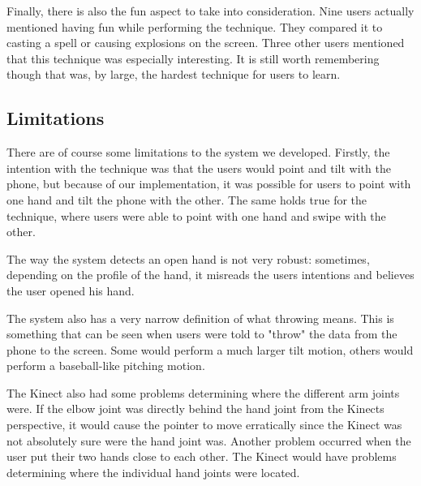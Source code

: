 Finally, there is also the fun aspect to take into consideration. Nine users actually mentioned having fun while performing the \pinch technique. 
They compared it to casting a spell or causing explosions on the screen. Three other users mentioned that this technique was especially interesting. 
It is still worth remembering though that \pinch was, by large, the hardest technique for users to learn. 

\subsection{Limitations}
\label{sec:limitations}
There are of course some limitations to the system we developed. 
Firstly, the intention with the \tilt technique was that the users would point and tilt with the phone, but because of our implementation, it was possible for users to point with one hand and tilt the phone with the other.
The same holds true for the \swipe technique, where users were able to point with one hand and swipe with the other.

The way the system detects an open hand is not very robust: sometimes, depending on the profile of the hand, it misreads the users intentions and believes the user opened his hand. 

The system also has a very narrow definition of what throwing means. 
This is something that can be seen when users were told to "throw" the data from the phone to the screen.
Some would perform a much larger tilt motion, others would perform a baseball-like pitching motion. 

The Kinect also had some problems determining where the different arm joints were.
If the elbow joint was directly behind the hand joint from the Kinects perspective, it would cause the pointer to move erratically since the Kinect was not absolutely sure were the hand joint was.
Another problem occurred when the user put their two hands close to each other. 
The Kinect would have problems determining where the individual hand joints were located. 
